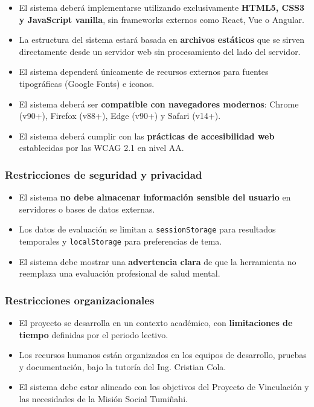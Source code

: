 \begin{itemize}
  \item El sistema deberá implementarse utilizando exclusivamente \textbf{HTML5, CSS3 y JavaScript vanilla}, sin frameworks externos como React, Vue o Angular.
  \item La estructura del sistema estará basada en \textbf{archivos estáticos} que se sirven directamente desde un servidor web sin procesamiento del lado del servidor.
  \item El sistema dependerá únicamente de recursos externos para fuentes tipográficas (Google Fonts) e iconos.
  \item El sistema deberá ser \textbf{compatible con navegadores modernos}: Chrome (v90+), Firefox (v88+), Edge (v90+) y Safari (v14+).
  \item El sistema deberá cumplir con las \textbf{prácticas de accesibilidad web} establecidas por las WCAG 2.1 en nivel AA.
\end{itemize}

\subsubsection{Restricciones de seguridad y privacidad}

\begin{itemize}
  \item El sistema \textbf{no debe almacenar información sensible del usuario} en servidores o bases de datos externas.
  \item Los datos de evaluación se limitan a \texttt{sessionStorage} para resultados temporales y \texttt{localStorage} para preferencias de tema.
  \item El sistema debe mostrar una \textbf{advertencia clara} de que la herramienta no reemplaza una evaluación profesional de salud mental.
\end{itemize}

\subsubsection{Restricciones organizacionales}

\begin{itemize}
  \item El proyecto se desarrolla en un contexto académico, con \textbf{limitaciones de tiempo} definidas por el periodo lectivo.
  \item Los recursos humanos están organizados en los equipos de desarrollo, pruebas y documentación, bajo la tutoría del Ing. Cristian Cola.
  \item El sistema debe estar alineado con los objetivos del Proyecto de Vinculación y las necesidades de la Misión Social Tumiñahi.
\end{itemize}


